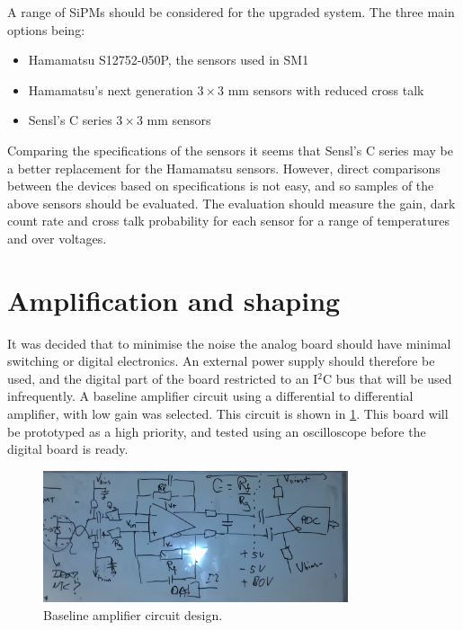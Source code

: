 \documentclass[a4paper]{article}
\begin{document}
A range of SiPMs should be considered for the upgraded system.
The three main options being:
\begin{itemize}
    \item Hamamatsu S12752-050P, the sensors used in SM1
    \item Hamamatsu's next generation $3\times3$ mm sensors with reduced cross talk
    \item Sensl's C series $3\times3$ mm sensors
\end{itemize}

Comparing the specifications of the sensors it seems that Sensl's C series may be a better replacement for the Hamamatsu sensors.
However, direct comparisons between the devices based on specifications is not easy, and so samples of the above sensors should be evaluated.
The evaluation should measure the gain, dark count rate and cross talk probability for each sensor for a range of temperatures and over voltages.


\section{Amplification and shaping}

It was decided that to minimise the noise the analog board should have minimal switching or digital electronics.
An external power supply should therefore be used, and the digital part of the board restricted to an I$^2$C bus that will be used infrequently.
A baseline amplifier circuit using a differential to differential amplifier, with low gain was selected.
This circuit is shown in \cref{amplifiercircuit}.
This board will be prototyped as a high priority, and tested using an oscilloscope before the digital board is ready.

\begin{figure}[htp]
    \begin{center}
        \includegraphics[width=0.8\textwidth]{imgs/amplifier}
        \caption{Baseline amplifier circuit design.}
        \label{amplifiercircuit}
    \end{center}
\end{figure}
\end{document}
